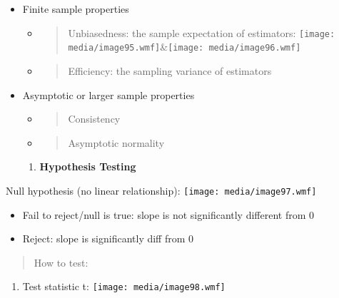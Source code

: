 \begin{itemize}
\item
  Finite sample properties

  \begin{itemize}
  \item
    \begin{quote}
    Unbiasedness: the sample expectation of estimators:
    \texttt{[image: media/image95.wmf]}\&\texttt{[image: media/image96.wmf]}
    \end{quote}
  \item
    \begin{quote}
    Efficiency: the sampling variance of estimators
    \end{quote}
  \end{itemize}
\item
  Asymptotic or larger sample properties

  \begin{itemize}
  \item
    \begin{quote}
    Consistency
    \end{quote}
  \item
    \begin{quote}
    Asymptotic normality
    \end{quote}
  \end{itemize}

  \begin{enumerate}
  \def\labelenumi{\arabic{enumi}.}
  \setcounter{enumi}{4}
  \item
    \textbf{Hypothesis Testing}
  \end{enumerate}
\end{itemize}

Null hypothesis (no linear relationship):
\texttt{[image: media/image97.wmf]}

\begin{itemize}
\item
  Fail to reject/null is true: slope is not significantly different from
  0
\item
  Reject: slope is significantly diff from 0
\end{itemize}

\begin{quote}
How to test:
\end{quote}

\begin{enumerate}
\def\labelenumi{\arabic{enumi}.}
\item
  Test statistic t: \texttt{[image: media/image98.wmf]}
\end{enumerate}

